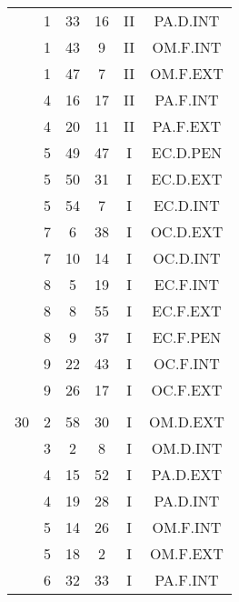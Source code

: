 \documentclass[12pt, a4paper]{article}
\begin{document}
\begin{multicols}{3}
{\begin{tabular}{c c c c c c}
	 	 	 	 & 1 & 33 & 16 & II & PA.D.INT\\%
	 	 	 	 & 1 & 43 & 9 & II & OM.F.INT\\%
	 	 	 	 & 1 & 47 & 7 & II & OM.F.EXT\\%
	 	 	 	 & 4 & 16 & 17 & II & PA.F.INT\\%
	 	 	 	 & 4 & 20 & 11 & II & PA.F.EXT\\%
	 	 	 	 & 5 & 49 & 47 & I & EC.D.PEN\\%
	 	 	 	 & 5 & 50 & 31 & I & EC.D.EXT\\%
	 	 	 	 & 5 & 54 & 7 & I & EC.D.INT\\%
	 	 	 	 & 7 & 6 & 38 & I & OC.D.EXT\\%
	 	 	 	 & 7 & 10 & 14 & I & OC.D.INT\\%
	 	 	 	 & 8 & 5 & 19 & I & EC.F.INT\\%
	 	 	 	 & 8 & 8 & 55 & I & EC.F.EXT\\%
	 	 	 	 & 8 & 9 & 37 & I & EC.F.PEN\\%
	 	 	 	 & 9 & 22 & 43 & I & OC.F.INT\\%
	 	 	 	 & 9 & 26 & 17 & I & OC.F.EXT\\%
	 	 	 	 & & & & & \\%
	 	 	 	30 & 2 & 58 & 30 & I & OM.D.EXT\\%
	 	 	 	 & 3 & 2 & 8 & I & OM.D.INT\\%
	 	 	 	 & 4 & 15 & 52 & I & PA.D.EXT\\%
	 	 	 	 & 4 & 19 & 28 & I & PA.D.INT\\%
	 	 	 	 & 5 & 14 & 26 & I & OM.F.INT\\%
	 	 	 	 & 5 & 18 & 2 & I & OM.F.EXT\\%
	 	 	 	 & 6 & 32 & 33 & I & PA.F.INT\\%

\end{tabular}}
\end{multicols}
\end{document}
